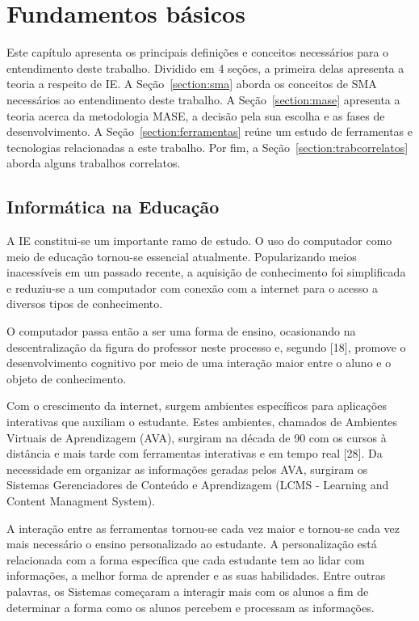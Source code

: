 \chapter{Fundamentos básicos}

Este capítulo apresenta os principais definições e conceitos necessários para o entendimento deste trabalho. Dividido em 4 seções, a primeira delas apresenta a teoria a respeito de IE. A Seção~\ref{section:sma} aborda os conceitos de SMA necessários ao entendimento deste trabalho. A Seção~\ref{section:mase} apresenta a teoria acerca da metodologia MASE, a decisão pela sua escolha e as fases de desenvolvimento. A Seção~\ref{section:ferramentas} reúne um estudo de ferramentas e tecnologias relacionadas a este trabalho. Por fim, a Seção~\ref{section:trabcorrelatos} aborda alguns trabalhos correlatos.

\section{Informática na Educação}
A IE constitui-se um importante ramo de estudo. O uso do computador como meio de educação tornou-se essencial atualmente. Popularizando meios inacessíveis em um passado recente, a aquisição de conhecimento foi simplificada e reduziu-se a um computador com conexão com a internet para o acesso a diversos tipos de conhecimento.
 
O computador passa então a ser uma forma de ensino, ocasionando na descentralização da figura do professor neste processo e, segundo [18], promove o desenvolvimento cognitivo por meio de uma interação maior entre o aluno e o objeto de conhecimento.
 
Com o crescimento da internet, surgem ambientes específicos para aplicações interativas que auxiliam o estudante. Estes ambientes, chamados de Ambientes Virtuais de Aprendizagem (AVA), surgiram na década de 90 com os cursos à distância e mais tarde com ferramentas interativas e em tempo real [28]. Da necessidade em organizar as informações geradas pelos AVA, surgiram os Sistemas Gerenciadores de Conteúdo e Aprendizagem (LCMS - Learning and Content Managment System).
 
A interação entre as ferramentas tornou-se cada vez maior e tornou-se cada vez mais necessário o ensino personalizado ao estudante. A personalização está relacionada com a forma específica que cada estudante tem ao lidar com informações, a melhor forma de aprender e as suas habilidades. Entre outras palavras, os Sistemas começaram a interagir mais com os alunos a fim de determinar a forma como os alunos percebem e processam as informações.

